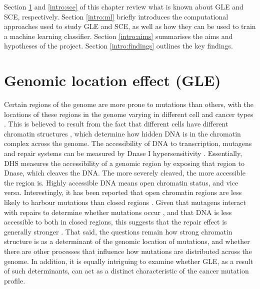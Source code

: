 Section \ref{intro:gle} and \ref{intro:sce} of this chapter review what is known about GLE and SCE, respectively. Section \ref{intro:ml} briefly introduces the computational approaches used to study GLE and SCE, as well as how they can be used to train a machine learning classifier. Section \ref{intro:aims} summarises the aims and hypotheses of the project. Section \ref{intro:findings} outlines the key findings.

\section{Genomic location effect (GLE)}
\label{intro:gle}
Certain regions of the genome are more prone to mutations than others, with the locations of these regions in the genome varying in different cell and cancer types \citep{Polak2015, Jiao2020}. This is believed to result from the fact that different cells have different chromatin structures \citep{Abascal2020ExpandedGenomes}, which determine how hidden DNA is in the chromatin complex across the genome. The accessibility of DNA to transcription, mutagens and repair systems can be measured by Dnase I hypersensitivity \citep[DHS;][]{Liu2019AApplications}. Essentially, DHS measures the accessibility of a genomic region by exposing that region to Dnase, which cleaves the DNA. The more severely cleaved, the more accessible the region is. Highly accessible DNA means open chromatin status, and vice versa. Interestingly, it has been reported that open chromatin regions are less likely to harbour mutations than closed regions \citep{Polak2015,Prendergast2007ChromatinGenome}. Given that \glspl{mutagen} interact with repairs to determine whether mutations occur \citep{Ripley2001Mutation}, and that DNA is less accessible to both in closed regions, this suggests that the repair effect is generally stronger \citep[Figure \ref{fig:chromatin_demo};][]{Teng1997ExcisionSequences, Morse2002PhotoreactivationCerevisiae}. That said, the questions remain how strong chromatin structure is as a determinant of the genomic location of mutations, and whether there are other processes that influence how mutations are distributed across the genome. In addition, it is equally intriguing to examine whether GLE, as a result of such determinants, can act as a distinct characteristic of the cancer mutation profile. 



